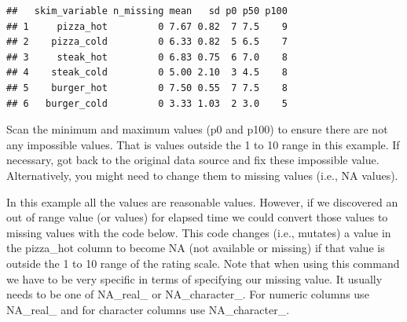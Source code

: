 \documentclass[
]{krantz}
\makeatletter
\newenvironment{Shaded}{\begin{snugshade}}{\end{snugshade}}
\newcommand{\CommentTok}[1]{\textcolor[rgb]{0.37,0.37,0.37}{\textit{#1}}}
\newcommand{\DataTypeTok}[1]{\textcolor[rgb]{0.27,0.27,0.27}{#1}}
\newcommand{\DecValTok}[1]{\textcolor[rgb]{0.06,0.06,0.06}{#1}}
\newcommand{\KeywordTok}[1]{\textcolor[rgb]{0.27,0.27,0.27}{\textbf{#1}}}
\newcommand{\NormalTok}[1]{#1}
\newcommand{\OperatorTok}[1]{\textcolor[rgb]{0.43,0.43,0.43}{\textbf{#1}}}
\newcommand{\OtherTok}[1]{\textcolor[rgb]{0.37,0.37,0.37}{#1}}
\newcommand{\StringTok}[1]{\textcolor[rgb]{0.5,0.5,0.5}{#1}}
\newenvironment{kframe}{%
\medskip{}
\setlength{\fboxsep}{.8em}
 \def\at@end@of@kframe{}%
 \ifinner\ifhmode%
  \def\at@end@of@kframe{\end{minipage}}%
  \begin{minipage}{\columnwidth}%
 \fi\fi%
 \def\FrameCommand##1{\hskip\@totalleftmargin \hskip-\fboxsep
 \colorbox{shadecolor}{##1}\hskip-\fboxsep
     \hskip-\linewidth \hskip-\@totalleftmargin \hskip\columnwidth}%
 \MakeFramed {\advance\hsize-\width
   \@totalleftmargin\z@ \linewidth\hsize
   \@setminipage}}%
 {\par\unskip\endMakeFramed%
 \at@end@of@kframe}
\renewenvironment{Shaded}{\begin{kframe}}{\end{kframe}}
\makeatother
\begin{document}
\begin{verbatim}
##   skim_variable n_missing mean   sd p0 p50 p100
## 1     pizza_hot         0 7.67 0.82  7 7.5    9
## 2    pizza_cold         0 6.33 0.82  5 6.5    7
## 3     steak_hot         0 6.83 0.75  6 7.0    8
## 4    steak_cold         0 5.00 2.10  3 4.5    8
## 5    burger_hot         0 7.50 0.55  7 7.5    8
## 6   burger_cold         0 3.33 1.03  2 3.0    5
\end{verbatim}

Scan the minimum and maximum values (p0 and p100) to ensure there are not any impossible values. That is values outside the 1 to 10 range in this example. If necessary, got back to the original data source and fix these impossible value. Alternatively, you might need to change them to missing values (i.e., NA values).

In this example all the values are reasonable values. However, if we discovered an out of range value (or values) for elapsed time we could convert those values to missing values with the code below. This code changes (i.e., mutates) a value in the pizza\_hot column to become NA (not available or missing) if that value is outside the 1 to 10 range of the rating scale. Note that when using this command we have to be very specific in terms of specifying our missing value. It usually needs to be one of NA\_real\_ or NA\_character\_. For numeric columns use NA\_real\_ and for character columns use NA\_character\_.

\begin{Shaded}
\end{Shaded}
\end{document}
